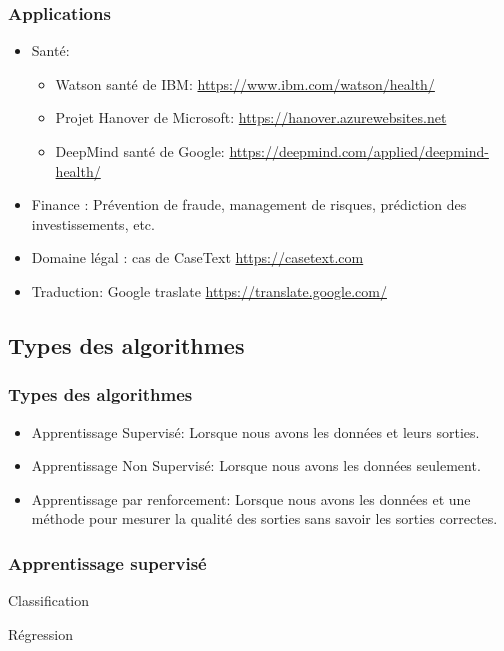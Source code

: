 \documentclass[]{beamer} %
\newcommand{\lien}[1]{{\tiny\url{#1}}}
\begin{document}
\begin{frame}
\frametitle{Applications}

\begin{itemize}
	\item Santé:
	\begin{itemize}
		\item Watson santé de IBM: \lien{https://www.ibm.com/watson/health/}
		\item Projet Hanover de Microsoft: \lien{https://hanover.azurewebsites.net}
		\item DeepMind santé de Google: \lien{https://deepmind.com/applied/deepmind-health/}
	\end{itemize}

	\item Finance \cite{2018-EISENBERG}: Prévention de fraude, management de risques, prédiction des investissements, etc.
	\item Domaine légal \cite{2017-beyer}: cas de CaseText \lien{https://casetext.com}
	\item Traduction: Google traslate \lien{https://translate.google.com/}
\end{itemize}

\end{frame}


\subsection{Types des algorithmes}

\begin{frame}
\frametitle{Types des algorithmes}

\begin{itemize}
	\item Apprentissage Supervisé: Lorsque nous avons les données et leurs sorties.
	\item Apprentissage Non Supervisé: Lorsque nous avons les données seulement.
	\item Apprentissage par renforcement: Lorsque nous avons les données et une méthode pour mesurer la qualité des sorties sans savoir les sorties correctes. 
\end{itemize}

\end{frame}


\begin{frame}
\frametitle{Apprentissage supervisé}


Classification 

Régression 

\end{frame}
\end{document}
